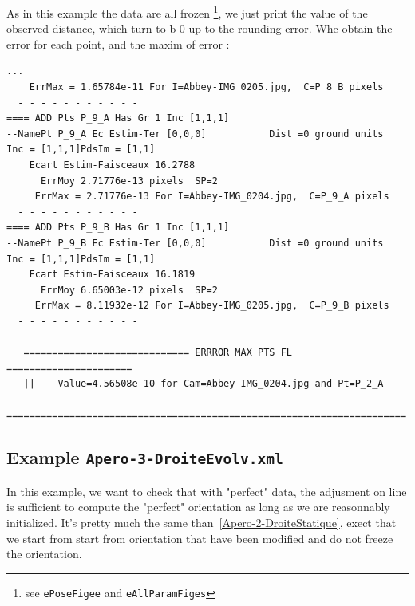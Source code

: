 As in this example the data are all frozen \footnote{see {\tt ePoseFigee} and {\tt eAllParamFiges}}, we just print the
value of the observed distance, which turn to b $0$ up to the rounding error. Whe obtain the error for each point, and 
the maxim of error :


\begin{verbatim}
...
    ErrMax = 1.65784e-11 For I=Abbey-IMG_0205.jpg,  C=P_8_B pixels 
  - - - - - - - - - - - 
==== ADD Pts P_9_A Has Gr 1 Inc [1,1,1]
--NamePt P_9_A Ec Estim-Ter [0,0,0]           Dist =0 ground units
Inc = [1,1,1]PdsIm = [1,1]
    Ecart Estim-Faisceaux 16.2788
      ErrMoy 2.71776e-13 pixels  SP=2 
     ErrMax = 2.71776e-13 For I=Abbey-IMG_0204.jpg,  C=P_9_A pixels 
  - - - - - - - - - - - 
==== ADD Pts P_9_B Has Gr 1 Inc [1,1,1]
--NamePt P_9_B Ec Estim-Ter [0,0,0]           Dist =0 ground units
Inc = [1,1,1]PdsIm = [1,1]
    Ecart Estim-Faisceaux 16.1819
      ErrMoy 6.65003e-12 pixels  SP=2 
     ErrMax = 8.11932e-12 For I=Abbey-IMG_0205.jpg,  C=P_9_B pixels 
  - - - - - - - - - - - 

   ============================= ERRROR MAX PTS FL ======================
   ||    Value=4.56508e-10 for Cam=Abbey-IMG_0204.jpg and Pt=P_2_A
   ======================================================================
\end{verbatim}


\subsection{Example {\tt Apero-3-DroiteEvolv.xml}}

In this example, we  want to check that with "perfect" data, the adjusment on line
is sufficient to compute the "perfect" orientation as long as we are reasonnably initialized.
It's pretty much the same than~\ref{Apero-2-DroiteStatique},
exect that we start from start from orientation that have been modified and
do not freeze the orientation.


